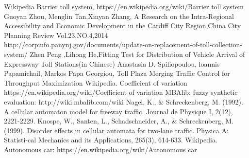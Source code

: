 \begin{thebibliography}{99}
 Wikipedia Barrier toll system, 
https://en.wikipedia.org/wiki/Barrier toll system
 Guoyan Zhou, Menglin Tan,Xinyan Zhang,
A Research on the Intra-Regional Accessibility and Economic Development in the Cardiff City Region,China City Planning Review Vol.23,NO.4,2014
 http://corpinfo.panynj.gov/documents/update-on-replacement-of-toll-collection-system/
 Zhen Peng ,Lihong He,Fitting
Test for Distribution of Vehicle Arrival of Expressway Toll Stations(in Chinese)
 Anastasia D. Spiliopoulou, loannis Papamichail, Markos Papa Georgiou,
Toll Plaza Merging Traffic Control for Throughput Maximization
 Wikipedia. Coefficient of variation
https://en.wikipedia.org/wiki/Coefficient of variation
 MBAlib: fuzzy synthetic evaluation:
http://wiki.mbalib.com/wiki
 Nagel, K., \& Schreckenberg, M. (1992).
A cellular automaton model for freeway traffic. Journal de Physique I, 2(12), 2221-2229.
 Knospe, W., Santen, L., Schadschneider, A., \& Schreckenberg, M. (1999).
Disorder effects in cellular automata for two-lane traffic. Physica A: Statisti-cal Mechanics and its Applications, 265(3), 614-633.
 Wikipedia. Autonomous car: 
https://en.wikipedia.org/wiki/Autonomous car
\end{thebibliography}
